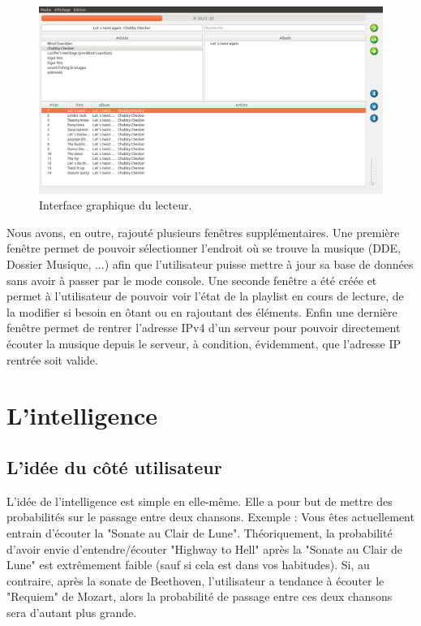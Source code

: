 \documentclass{report}
\begin{document}
\begin{figure}[h]
\centering
\includegraphics[scale=.3]{interface.png}
\caption{Interface graphique du lecteur.}
\end{figure}


Nous avons, en outre, rajouté plusieurs fenêtres supplémentaires. Une première fenêtre permet de pouvoir sélectionner l'endroit où se trouve la musique (DDE, Dossier Musique, ...) afin que l'utilisateur puisse mettre à jour sa base de données sans avoir à passer par le mode console. Une seconde fenêtre a été créée et permet à l'utilisateur de pouvoir voir l'état de la playlist en cours de lecture, de la modifier si besoin en ôtant ou en rajoutant des éléments. Enfin une dernière fenêtre permet de rentrer l'adresse IPv4 d'un serveur pour pouvoir directement écouter la musique depuis le serveur, à condition, évidemment, que l'adresse IP rentrée soit valide.

\section{L'intelligence}
\subsection{L'idée du côté utilisateur}

L'idée de l'intelligence est simple en elle-même. Elle a pour but de mettre des probabilités sur le passage entre deux chansons. Exemple : Vous êtes actuellement entrain d'écouter la "Sonate au Clair de Lune". Théoriquement, la probabilité d'avoir envie d'entendre/écouter "Highway to Hell" après la "Sonate au Clair de Lune" est extrêmement faible (sauf si cela est dans vos habitudes).
Si, au contraire, après la sonate de Beethoven, l'utilisateur a tendance à écouter le "Requiem" de Mozart, alors la probabilité de passage entre ces deux chansons sera d'autant plus grande.
\end{document}
